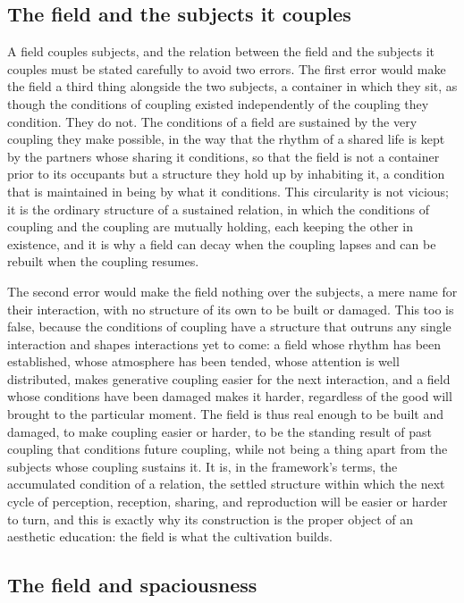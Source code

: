 \subsection{The field and the subjects it couples}
\label{p22:sub:field-subjects}

A field couples subjects, and the relation between the field and the subjects it couples must be stated carefully to avoid two errors. The first error would make the field a third thing alongside the two subjects, a container in which they sit, as though the conditions of coupling existed independently of the coupling they condition. They do not. The conditions of a field are sustained by the very coupling they make possible, in the way that the rhythm of a shared life is kept by the partners whose sharing it conditions, so that the field is not a container prior to its occupants but a structure they hold up by inhabiting it, a condition that is maintained in being by what it conditions. This circularity is not vicious; it is the ordinary structure of a sustained relation, in which the conditions of coupling and the coupling are mutually holding, each keeping the other in existence, and it is why a field can decay when the coupling lapses and can be rebuilt when the coupling resumes.

The second error would make the field nothing over the subjects, a mere name for their interaction, with no structure of its own to be built or damaged. This too is false, because the conditions of coupling have a structure that outruns any single interaction and shapes interactions yet to come: a field whose rhythm has been established, whose atmosphere has been tended, whose attention is well distributed, makes generative coupling easier for the next interaction, and a field whose conditions have been damaged makes it harder, regardless of the good will brought to the particular moment. The field is thus real enough to be built and damaged, to make coupling easier or harder, to be the standing result of past coupling that conditions future coupling, while not being a thing apart from the subjects whose coupling sustains it. It is, in the framework's terms, the accumulated condition of a relation, the settled structure within which the next cycle of perception, reception, sharing, and reproduction will be easier or harder to turn, and this is exactly why its construction is the proper object of an aesthetic education: the field is what the cultivation builds.

\subsection{The field and spaciousness}
\label{p22:sub:field-spaciousness}

